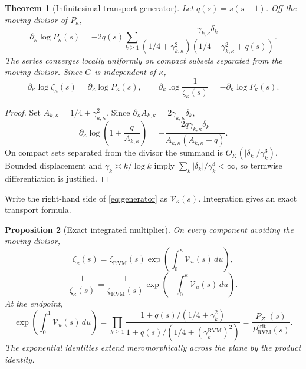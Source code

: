 \documentclass[11pt,reqno]{amsart}
\newtheorem{theorem}{Theorem}[section]
\newtheorem{proposition}[theorem]{Proposition}
\theoremstyle{definition}
\theoremstyle{remark}
\newcommand{\RVM}{\mathrm{RVM}}
\newcommand{\crit}{\mathrm{crit}}
\begin{document}
\begin{theorem}[Infinitesimal transport generator]\label{thm:generator}
Let $q(s)=s(s-1)$.  Off the moving divisor of $P_\kappa$,
\begin{equation}\label{eq:generator}
 \boxed{
 \partial_\kappa\log P_\kappa(s)
 =-2q(s)\sum_{k\ge1}
 \frac{\gamma_{k,\kappa}\delta_k}
 {(1/4+\gamma_{k,\kappa}^2)
  (1/4+\gamma_{k,\kappa}^2+q(s))}.}
\end{equation}
The series converges locally uniformly on compact subsets separated from the moving divisor.  Since $G$ is independent of $\kappa$,
\begin{equation}\label{eq:generator-zeta}
 \partial_\kappa\log\zeta_\kappa(s)
 =\partial_\kappa\log P_\kappa(s),
 \qquad
 \partial_\kappa\log\frac1{\zeta_\kappa(s)}
 =-\partial_\kappa\log P_\kappa(s).
\end{equation}
\end{theorem}

\begin{proof}
Set $A_{k,\kappa}=1/4+\gamma_{k,\kappa}^2$.  Since
$\partial_\kappa A_{k,\kappa}=2\gamma_{k,\kappa}\delta_k$,
\[
 \partial_\kappa
 \log\left(1+\frac{q}{A_{k,\kappa}}\right)
 =-\frac{2q\gamma_{k,\kappa}\delta_k}
 {A_{k,\kappa}(A_{k,\kappa}+q)}.
\]
On compact sets separated from the divisor the summand is
$O_K(|\delta_k|/\gamma_k^3)$.  Bounded displacement and
$\gamma_k\asymp k/\log k$ imply
$\sum_k|\delta_k|/\gamma_k^3<\infty$, so termwise differentiation is justified.
\end{proof}

Write the right-hand side of \eqref{eq:generator} as $\mathcal V_\kappa(s)$.  Integration gives an exact transport formula.

\begin{proposition}[Exact integrated multiplier]\label{prop:integrated-multiplier}
On every component avoiding the moving divisor,
\begin{equation}\label{eq:integrated-zeta}
 \boxed{
 \zeta_\kappa(s)
 =\zeta_{\RVM}(s)
 \exp\left(\int_0^\kappa\mathcal V_u(s)\,du\right),}
\end{equation}
\begin{equation}\label{eq:integrated-inverse}
 \boxed{
 \frac1{\zeta_\kappa(s)}
 =\frac1{\zeta_{\RVM}(s)}
 \exp\left(-\int_0^\kappa\mathcal V_u(s)\,du\right).}
\end{equation}
At the endpoint,
\begin{equation}\label{eq:integrated-product-ratio}
 \exp\left(\int_0^1\mathcal V_u(s)\,du\right)
 =\prod_{k\ge1}
 \frac{1+q(s)/(1/4+\gamma_k^2)}
      {1+q(s)/(1/4+(\gamma_k^{\RVM})^2)}
 =\frac{P_{Z1}(s)}{P_{\RVM}^{\crit}(s)}.
\end{equation}
The exponential identities extend meromorphically across the plane by the product identity.
\end{proposition}
\end{document}

